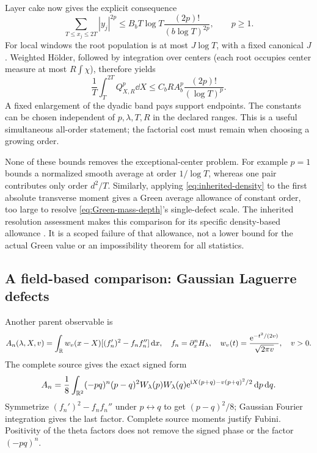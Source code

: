 Layer cake now gives the explicit consequence
\[
 \sum_{T\le x_j\le2T}|y_j|^{2p}
 \le B_bT\log T\frac{(2p)!}{(b\log T)^{2p}},\qquad p\ge1.
\]
For local windows the root population is at most \(J\log T\), with
a fixed canonical \(J\). Weighted H\"older, followed by integration
over centers (each root occupies center measure at most \(R\int\chi\)),
therefore yields
\begin{equation}\label{eq:moment-all-orders}
 \frac1T\int_T^{2T}Q_{X,R}^p\dd X
 \le C_bR A_b^p\frac{(2p)!}{(\log T)^p}.
\end{equation}
A fixed enlargement of the dyadic band pays support endpoints. The
constants can be chosen independent of \(p,\lambda,T,R\) in the
declared ranges. This is a useful simultaneous all-order statement;
the factorial cost must remain when choosing a growing order.

None of these bounds removes the exceptional-center problem. For
example \(p=1\) bounds a normalized smooth average at order
\(1/\log T\), whereas one pair contributes only order \(d^2/T\).
Similarly, applying \eqref{eq:inherited-density} to the first absolute
transverse moment gives a Green average allowance of constant order,
too large to resolve \eqref{eq:Green-mass-depth}'s single-defect scale.
The inherited resolution assessment makes this comparison for its
specific density-based allowance \cite{OGResolution}. It is a scoped
failure of that allowance, not a lower bound for the actual Green value
or an impossibility theorem for all statistics.

\subsection{A field-based comparison: Gaussian Laguerre defects}
Another parent observable is
\[
 A_n(\lambda,X,v)=\int_\mathbb R w_v(x-X)[(f_n')^2-f_nf_n'']\,\mathrm d x,
 \quad f_n=\partial_x^nH_\lambda,\quad
 w_v(t)=\frac{\mathrm e^{-t^2/(2v)}}{\sqrt{2\pi v}},\quad v>0.
\]
The complete source gives the exact signed form
\begin{equation}\label{eq:Gaussian-source}
 A_n=\frac18\int_{\mathbb R^2}(-pq)^n(p-q)^2W_\lambda(p)W_\lambda(q)
             \mathrm e^{\mathrm i X(p+q)-v(p+q)^2/2}\,\mathrm d p\,\mathrm d q.
\end{equation}
Symmetrize \((f_n')^2-f_nf_n''\) under \(p\leftrightarrow q\) to get
\((p-q)^2/8\); Gaussian Fourier integration gives the last factor.
Complete source moments justify Fubini. Positivity of the theta factors
does not remove the signed phase or the factor \((-pq)^n\).

